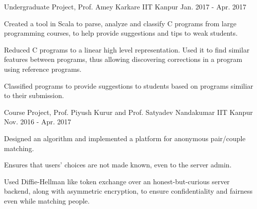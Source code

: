 


\begin{cventries}

  \cventry
  {Undergraduate Project, Prof. Amey Karkare}
  {{}
    {}}
  {IIT Kanpur}
  {Jan. 2017 - Apr. 2017}
  {
    \begin{cvitems}
    \item Created a tool in Scala to parse, analyze and classify C programs from large programming courses, to help provide suggestions and tips to weak students.
    \item Reduced C programs to a linear high level representation. Used it to find similar features between programs, thus allowing discovering corrections in a program using reference programs.
    \item Classified programs to provide suggestions to students based on programs similiar to their submission.
    \end{cvitems}
    \vspace{-5mm}
  }

  \cventry
  {Course Project, Prof. Piyush Kurur and
    Prof. Satyadev Nandakumar}
  {\href{https://github.com/pclubiitk/puppy-love}{}}
  {IIT Kanpur}
  {Nov. 2016 - Apr. 2017}
  {
    \begin{cvitems}
      \item Designed an algorithm and implemented a platform
        for anonymous pair/couple matching.
      \item Ensures that users' choices are not made known, even to the
        server admin.
      \item Used Diffie-Hellman like token exchange over an
        honest-but-curious server backend, along with asymmetric encryption, to
        ensure confidentiality and fairness even while matching people.
    \end{cvitems}
  }



\end{cventries}
